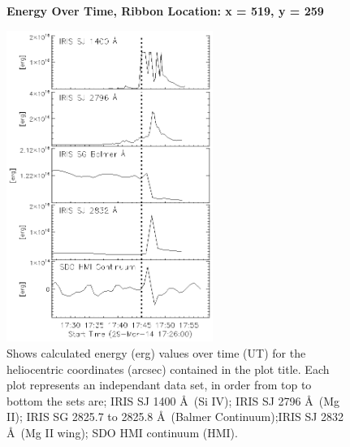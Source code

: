 \begin{figure}[H]
  \begin{center}
  \textbf{Energy Over Time, Ribbon Location: x = 519, y = 259 }\par\medskip
  \includegraphics[width=0.6\textwidth]{29-Mar-14-Ribbon-xyPosition-519-259-Frame-2-Energy-Ladder}
  \end{center}
  \caption{Shows calculated energy (erg) values over time (UT) for the heliocentric coordinates (arcsec) contained in the plot title. Each plot represents an independant data set, in order from top to bottom the sets are; IRIS SJ 1400 \AA\ (Si IV); IRIS SJ 2796 \AA\ (Mg II); IRIS SG  2825.7 to 2825.8 \AA\ (Balmer Continuum);IRIS SJ 2832 \AA\ (Mg II wing); SDO HMI continuum (HMI).}\label{erb12}
\end{figure}

